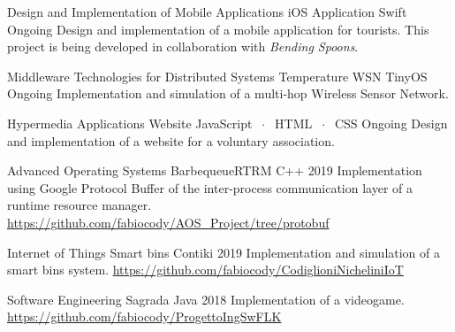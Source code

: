 

\begin{cventries}

\cventry
    {Design and Implementation of Mobile Applications}
    {iOS Application}
    {Swift}
    {Ongoing}
    {Design and implementation of a mobile application for tourists. This project is being developed in collaboration with \textit{Bending Spoons}.}
    
\cventry
    {Middleware Technologies for Distributed Systems}
    {Temperature WSN}
    {TinyOS}
    {Ongoing}
    {Implementation and simulation of a multi-hop Wireless Sensor Network.}
    
\cventry
    {Hypermedia Applications}
    {Website}
    {JavaScript $\;\cdot\;$ HTML $\;\cdot\;$ CSS}
    {Ongoing}
    {Design and implementation of a website for a voluntary association.}

\iffalse
\cventry
    {Recommender System}
    {Kaggle competition}
    {Python}
    {}
    {Design and implementation of a system able to recommend relevant items to users of an e-commerce website. \href{https://github.com/Alenichel/CodiglioniNichelini\_recsys-polimi-2019}{https://github.com/Alenichel/CodiglioniNichelini\_recsys-polimi-2019}}
\fi
    
\cventry
    {Advanced Operating Systems}
    {BarbequeueRTRM}
    {C++}
    {2019}
    {Implementation using Google Protocol Buffer of the inter-process communication layer of a runtime resource manager. \href{https://github.com/fabiocody/AOS\_Project/tree/protobuf}{https://github.com/fabiocody/AOS\_Project/tree/protobuf}}
    
\cventry
    {Internet of Things}
    {Smart bins}
    {Contiki}
    {2019}
    {Implementation and simulation of a smart bins system. \qquad\qquad\qquad\qquad\qquad\qquad\qquad\qquad \href{https://github.com/fabiocody/CodiglioniNicheliniIoT}{https://github.com/fabiocody/CodiglioniNicheliniIoT}}
    
\cventry
    {Software Engineering}
    {Sagrada}
    {Java}
    {2018}
    {Implementation of a videogame. \qquad\qquad\qquad\qquad\qquad\qquad\qquad\qquad\qquad\qquad\qquad\qquad\qquad \href{https://github.com/fabiocody/ProgettoIngSwFLK}{https://github.com/fabiocody/ProgettoIngSwFLK}}
\end{cventries}
